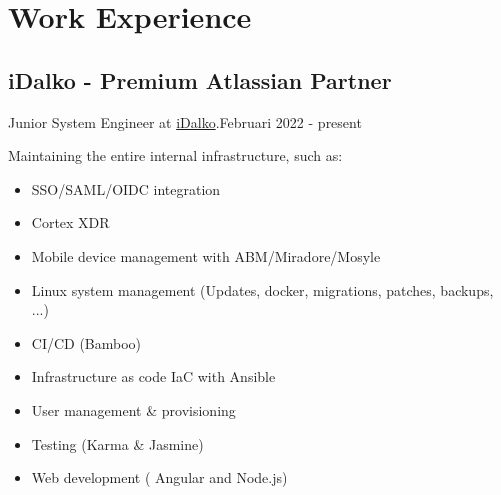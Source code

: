 \section{Work Experie\textcolor{mycolor}{nce}}
  \subsection{iDalko - Premium Atlassian Partner}
    \vspace{.55em}
    Junior System Engineer at {\href{https://www.idalko.com}{iDalko}}.{\textcolor{mygrey}{\hspace*{\fill}Februari 2022 - present}}

    Maintaining the entire internal infrastructure, such as:

    \begin{itemize}
      \item SSO/SAML/OIDC integration
      \item Cortex XDR
      \item Mobile device management with ABM/Miradore/Mosyle
      \item Linux system management (Updates, docker, migrations, patches, backups, ...)
      \item CI/CD (Bamboo)
      \item Infrastructure as code IaC with Ansible
      \item User management \& provisioning
      \item Testing (Karma \& Jasmine)
      \item Web development ( Angular and Node.js)
    \end{itemize}